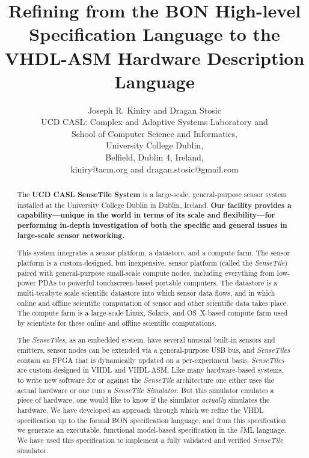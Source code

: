 \documentclass{article}
\newcommand{\ST}{\emph{SenseTile}\xspace}
\newcommand{\STs}{\emph{SenseTiles}\xspace}
\newcommand{\STS}{\emph{SenseTile Simulator}\xspace}
\begin{document}
\title{Refining from the BON High-level Specification Language to the
  VHDL-ASM Hardware Description Language}

\author{Joseph R. Kiniry and Dragan Stosic\\
UCD CASL: Complex and Adaptive Systems Laboratory and\\
School of Computer Science and Informatics,\\
University College Dublin,\\
Belfield, Dublin 4, Ireland,\\
kiniry@acm.org and dragan.stosic@gmail.com\\
}

\maketitle

\begin{abstract}
  
The \textbf{UCD CASL SenseTile System} is a large-scale, general-purpose
sensor system installed at the University College Dublin in Dublin,
Ireland.  \textbf{Our facility provides a capability---unique in the world in
terms of its scale and flexibility---for performing in-depth
investigation of both the specific and general issues in large-scale
sensor networking.}

This system integrates a sensor platform, a datastore, and a compute
farm.  The sensor platform is a custom-designed, but inexpensive,
sensor platform (called the \ST) paired with general-purpose
small-scale compute nodes, including everything from low-power PDAs to
powerful touchscreen-based portable computers.  The datastore is a
multi-terabyte scale scientific datastore into which sensor data
flows, and in which online and offline scientific computation of
sensor and other scientific data takes place.  The compute farm is a
large-scale Linux, Solaris, and OS~X-based compute farm used by
scientists for these online and offline scientific computations.

The \STs, as an embedded system, have several unusual built-in sensors 
and emitters, sensor nodes can be extended via a general-purpose USB bus, 
and \STs contain an FPGA that is dynamically updated on a per-experiment 
basis.  \STs are custom-designed in VHDL and VHDL-ASM.  Like many hardware-based systems,
 to write new software for or against the \ST architecture one either uses
the actual hardware or one runs a \STS.  But this simulator emulates a
piece of hardware, one would like to know if the simulator
\emph{actually} simulates the hardware.  We have developed an approach
through which we refine the VHDL specification up to the formal BON
specification language, and from this specification we generate an
executable, functional model-based specification in the JML language.
We have used this specification to implement a fully validated and
verified \ST simulator.

\end{abstract}
\end{document}
